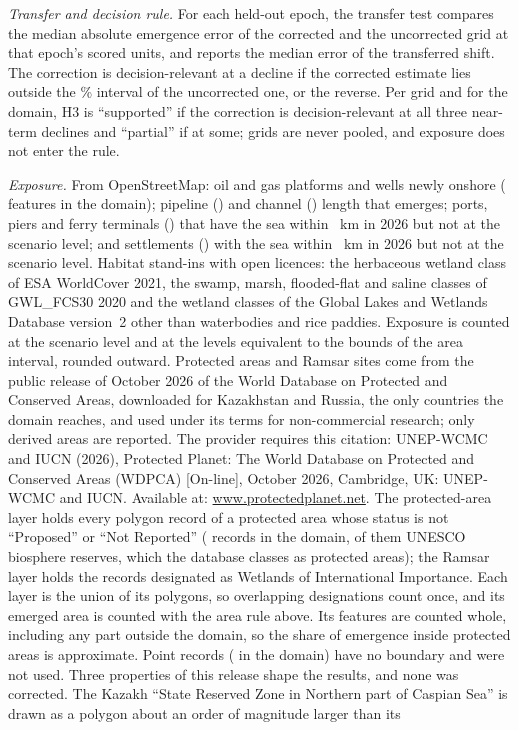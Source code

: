 \emph{Transfer and decision rule.} For each held-out epoch, the transfer test compares the median absolute emergence error of the corrected and the uncorrected grid at that epoch's scored units, and reports the median error of the transferred shift. The correction is decision-relevant at a decline if the corrected estimate lies outside the \% interval of the uncorrected one, or the reverse. Per grid and for the domain, H3 is ``supported'' if the correction is decision-relevant at all three near-term declines and ``partial'' if at some; grids are never pooled, and exposure does not enter the rule.

\emph{Exposure.} From OpenStreetMap\citep{osm}: oil and gas platforms and wells newly onshore ( features in the domain); pipeline () and channel () length that emerges; ports, piers and ferry terminals () that have the sea within ~km in 2026 but not at the scenario level; and settlements () with the sea within ~km in 2026 but not at the scenario level. Habitat stand-ins with open licences: the herbaceous wetland class of ESA WorldCover 2021\citep{worldcover2021}, the swamp, marsh, flooded-flat and saline classes of GWL\_FCS30 2020\citep{zhang2023} and the wetland classes of the Global Lakes and Wetlands Database version~2 other than waterbodies and rice paddies\citep{lehner2025}. Exposure is counted at the scenario level and at the levels equivalent to the bounds of the area interval, rounded outward. Protected areas and Ramsar sites come from the public release of October 2026 of the World Database on Protected and Conserved Areas, downloaded for Kazakhstan and Russia, the only countries the domain reaches, and used under its terms for non-commercial research; only derived areas are reported. The provider requires this citation: UNEP-WCMC and IUCN (2026), Protected Planet: The World Database on Protected and Conserved Areas (WDPCA) [On-line], October 2026, Cambridge, UK: UNEP-WCMC and IUCN. Available at: \url{www.protectedplanet.net}\citep{wdpa}. The protected-area layer holds every polygon record of a protected area whose status is not ``Proposed'' or ``Not Reported'' ( records in the domain,  of them UNESCO biosphere reserves, which the database classes as protected areas); the Ramsar layer holds the records designated as Wetlands of International Importance. Each layer is the union of its polygons, so overlapping designations count once, and its emerged area is counted with the area rule above. Its features are counted whole, including any part outside the domain, so the share of emergence inside protected areas is approximate. Point records ( in the domain) have no boundary and were not used. Three properties of this release shape the results, and none was corrected. The Kazakh ``State Reserved Zone in Northern part of Caspian Sea'' is drawn as a polygon about an order of magnitude larger than its 